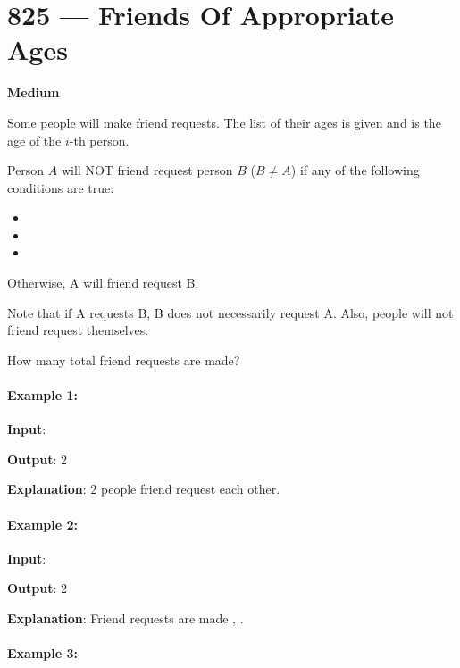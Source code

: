 \section{825 --- Friends Of Appropriate Ages}

\textbf{Medium}

Some people will make friend requests. The list of their ages is given and  is the age of the $i$-th person. 

Person $A$ will NOT friend request person $B$ ($B \neq A$) if any of the following conditions are true:

\begin{itemize}
\item {}
\item {}
\item {}
\end{itemize}

Otherwise, A will friend request B.

Note that if A requests B, B does not necessarily request A.  Also, people will not friend request themselves.

How many total friend requests are made?

\paragraph{Example 1:}

\begin{flushleft}
\textbf{Input}: \fcj{[16,16]}

\textbf{Output}: 2

\textbf{Explanation}: 2 people friend request each other.

\end{flushleft}

\paragraph{Example 2:}

\begin{flushleft}
\textbf{Input}: \fcj{[16,17,18]}

\textbf{Output}: 2

\textbf{Explanation}: Friend requests are made , .
\end{flushleft}

\paragraph{Example 3:}

